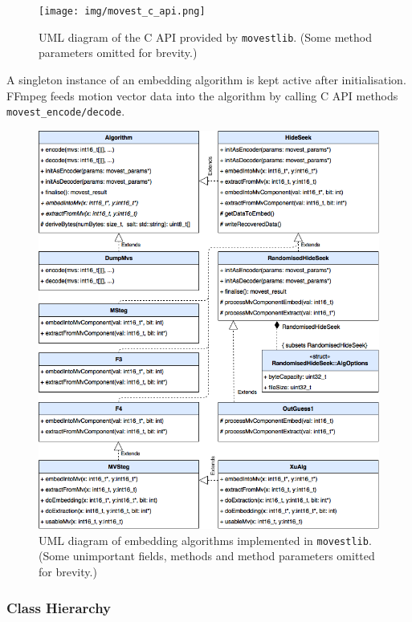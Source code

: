 \documentclass[12pt,british,twoside,notitlepage,usenames,dvipsnames,hypens,final]{report}
\numberwithin{equation}{section}
\numberwithin{figure}{section}
\begin{document}
\begin{figure}[tbh]
\centering
\texttt{[image: img/movest\_c\_api.png]}
\caption{UML diagram of the C API provided by \texttt{movestlib}. (Some method parameters omitted for brevity.)}
\label{fig:movest-c-api}
\end{figure}

A singleton instance of an embedding algorithm is kept active after initialisation. FFmpeg feeds motion vector data into the algorithm by calling C API methods \texttt{movest\_encode/decode}.  

\begin{figure}[!htbp]
\centering
\includegraphics[width=\textwidth]{img/movest_alg_class_diag.png}
\caption{UML diagram of embedding algorithms implemented in \texttt{movestlib}. (Some unimportant fields, methods and method parameters omitted for brevity.)}
\label{fig:movest_alg_class_diag}
\end{figure}

\subsubsection{Class Hierarchy}
\end{document}
